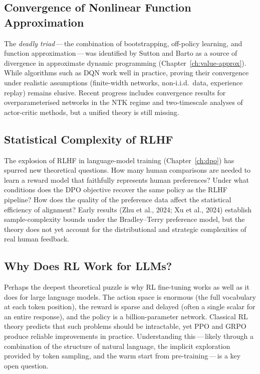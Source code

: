 \subsection{Convergence of Nonlinear Function Approximation}

The \emph{deadly triad}\,---\,the combination of bootstrapping,
off-policy learning, and function approximation\,---\,was identified
by Sutton and Barto as a source of divergence in approximate dynamic
programming (Chapter~\ref{ch:value-approx}).  While algorithms such
as DQN work well in practice, proving their convergence under
realistic assumptions (finite-width networks, non-i.i.d.\ data,
experience replay) remains elusive.  Recent progress includes
convergence results for overparameterised networks in the NTK regime
and two-timescale analyses of actor-critic methods, but a unified
theory is still missing.

\subsection{Statistical Complexity of RLHF}

The explosion of RLHF in language-model training
(Chapter~\ref{ch:dpo}) has spurred new theoretical questions.  How
many human comparisons are needed to learn a reward model that
faithfully represents human preferences?  Under what conditions does
the DPO objective recover the same policy as the RLHF pipeline?  How
does the quality of the preference data affect the statistical
efficiency of alignment?  Early results (Zhu et al., 2024; Xu et al.,
2024) establish sample-complexity bounds under the
Bradley--Terry preference model, but the
theory does not yet account for the distributional and strategic
complexities of real human feedback.

\subsection{Why Does RL Work for LLMs?}

Perhaps the deepest theoretical puzzle is why RL fine-tuning works as
well as it does for large language models.  The action space is
enormous (the full vocabulary at each token position), the reward is
sparse and delayed (often a single scalar for an entire response), and
the policy is a billion-parameter network.  Classical RL theory
predicts that such problems should be intractable, yet PPO and GRPO
produce reliable improvements in practice.  Understanding
this\,---\,likely through a combination of the structure of natural
language, the implicit exploration provided by token sampling, and the
warm start from pre-training\,---\,is a key open question.


